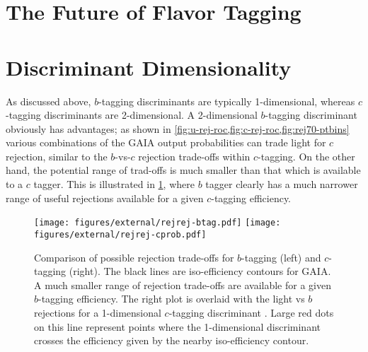 

\section{The Future of Flavor Tagging}
\label{sec:tag-future}



\section{Discriminant Dimensionality}

As discussed above, $b$-tagging discriminants are typically 1-dimensional, whereas $c$-tagging discriminants are 2-dimensional.
A 2-dimensional $b$-tagging discriminant obviously has advantages; as shown in \cref{fig:u-rej-roc,fig:c-rej-roc,fig:rej70-ptbins} various combinations of the GAIA output probabilities can trade light for $c$ rejection, similar to the $b$-vs-$c$ rejection trade-offs within $c$-tagging.
On the other hand, the potential range of trad-offs is much smaller than that which is available to a $c$ tagger.
This is illustrated in \cref{fig:btag-vs-ctag-rejrej}, where $b$ tagger clearly has a much narrower range of useful rejections available for a given $c$-tagging efficiency.

\begin{figure}
  \texttt{[image: figures/external/rejrej-btag.pdf]}
  \texttt{[image: figures/external/rejrej-cprob.pdf]}
  \caption[Rejection Trade-offs for $b$ and $c$ tagging]{%
    Comparison of possible rejection trade-offs for $b$-tagging (left) and $c$-tagging (right).
The black lines are iso-efficiency contours for GAIA.
A much smaller range of rejection trade-offs are available for a given $b$-tagging efficiency. The right plot is overlaid with the light vs $b$ rejections for a 1-dimensional $c$-tagging discriminant . Large red dots on this line represent points where the 1-dimensional discriminant crosses the efficiency given by the nearby iso-efficiency contour.}
  \label{fig:btag-vs-ctag-rejrej}
\end{figure}

